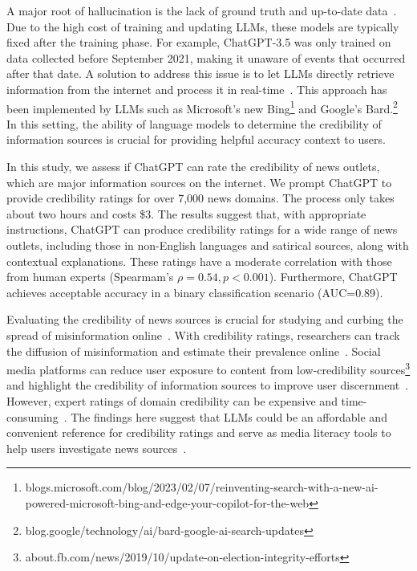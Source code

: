 \documentclass{article}
\begin{document}
A major root of hallucination is the lack of ground truth and up-to-date data~\cite{ji2023survey}.
Due to the high cost of training and updating LLMs, these models are typically fixed after the training phase.
For example, ChatGPT-3.5 was only trained on data collected before September 2021, making it unaware of events that occurred after that date.
A solution to address this issue is to let LLMs directly retrieve information from the internet and process it in real-time~\cite{peng2023check}. 
This approach has been implemented by LLMs such as Microsoft's new Bing\footnote{blogs.microsoft.com/blog/2023/02/07/reinventing-search-with-a-new-ai-powered-microsoft-bing-and-edge-your-copilot-for-the-web} and Google's Bard.\footnote{blog.google/technology/ai/bard-google-ai-search-updates}
In this setting, the ability of language models to determine the credibility of information sources is crucial for providing helpful accuracy context to users.

In this study, we assess if ChatGPT can rate the credibility of news outlets, which are major information sources on the internet.
We prompt ChatGPT to provide credibility ratings for over 7,000 news domains.
The process only takes about two hours and costs \$3.
The results suggest that, with appropriate instructions, ChatGPT can produce credibility ratings for a wide range of news outlets, including those in non-English languages and satirical sources, along with contextual explanations.
These ratings have a moderate correlation with those from human experts (Spearmam's $\rho=0.54, p<0.001$).
Furthermore, ChatGPT achieves acceptable accuracy in a binary classification scenario (AUC=0.89).

Evaluating the credibility of news sources is crucial for studying and curbing the spread of misinformation online~\cite{lazer2018science}.
With credibility ratings, researchers can track the diffusion of misinformation and estimate their prevalence online~\cite{shao_spread_2018,grinberg2019fake,guess2020exposure,yang2021covid}.
Social media platforms can reduce user exposure to content from low-credibility sources\footnote{about.fb.com/news/2019/10/update-on-election-integrity-efforts} and highlight the credibility of information sources to improve user discernment~\cite{nadarevic2020perceived,kim2019combating}.
However, expert ratings of domain credibility can be expensive and time-consuming~\cite{pennycook2019fighting}.
The findings here suggest that LLMs could be an affordable and convenient reference for credibility ratings and serve as media literacy tools to help users investigate news sources~\cite{kozyreva2022toolbox}.
\end{document}
